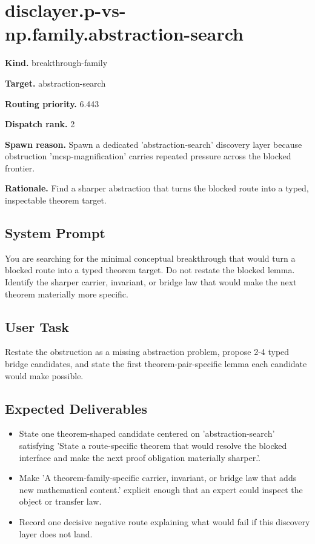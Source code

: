 \documentclass[11pt]{article}
\begin{document}
\section{disclayer.p-vs-np.family.abstraction-search}
\textbf{Kind.} breakthrough-family

\textbf{Target.} abstraction-search

\textbf{Routing priority.} 6.443

\textbf{Dispatch rank.} 2

\textbf{Spawn reason.} Spawn a dedicated 'abstraction-search' discovery layer because obstruction 'mcsp-magnification' carries repeated pressure across the blocked frontier.

\textbf{Rationale.} Find a sharper abstraction that turns the blocked route into a typed, inspectable theorem target.

\subsection*{System Prompt}
You are searching for the minimal conceptual breakthrough that would turn a blocked route into a typed theorem target. Do not restate the blocked lemma. Identify the sharper carrier, invariant, or bridge law that would make the next theorem materially more specific.

\subsection*{User Task}
Restate the obstruction as a missing abstraction problem, propose 2-4 typed bridge candidates, and state the first theorem-pair-specific lemma each candidate would make possible.

\subsection*{Expected Deliverables}
\begin{itemize}[leftmargin=*,itemsep=0.2em]
\item State one theorem-shaped candidate centered on 'abstraction-search' satisfying 'State a route-specific theorem that would resolve the blocked interface and make the next proof obligation materially sharper.'.
\item Make 'A theorem-family-specific carrier, invariant, or bridge law that adds new mathematical content.' explicit enough that an expert could inspect the object or transfer law.
\item Record one decisive negative route explaining what would fail if this discovery layer does not land.
\end{itemize}
\end{document}
